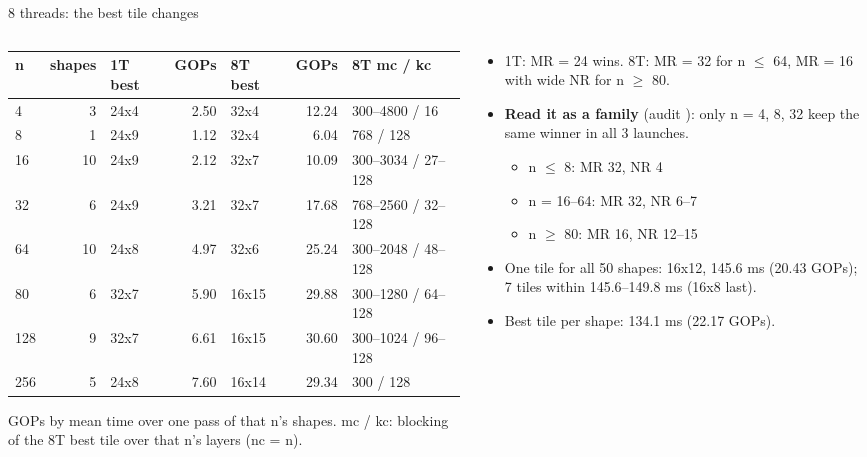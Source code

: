 \begin{frame}{8 threads: the best tile changes}
\begin{columns}[T]
\begin{column}{0.58\textwidth}
\tiny\setlength\tabcolsep{3pt}
\begin{tabular}{@{}lrlrlrl@{}}
\toprule
n & shapes & 1T best & GOPs & 8T best & GOPs & 8T mc / kc \\
\midrule
4 & 3 & 24x4 & 2.50 & 32x4 & 12.24 & 300--4800 / 16 \\
8 & 1 & 24x9 & 1.12 & 32x4 & 6.04 & 768 / 128 \\
16 & 10 & 24x9 & 2.12 & 32x7 & 10.09 & 300--3034 / 27--128 \\
32 & 6 & 24x9 & 3.21 & 32x7 & 17.68 & 768--2560 / 32--128 \\
64 & 10 & 24x8 & 4.97 & 32x6 & 25.24 & 300--2048 / 48--128 \\
80 & 6 & 32x7 & 5.90 & 16x15 & 29.88 & 300--1280 / 64--128 \\
128 & 9 & 32x7 & 6.61 & 16x15 & 30.60 & 300--1024 / 96--128 \\
256 & 5 & 24x8 & 7.60 & 16x14 & 29.34 & 300 / 128 \\
\bottomrule
\end{tabular}

\vspace{4pt}
GOPs by mean time over one pass of that n's shapes. mc / kc: blocking of the 8T best tile over that n's layers (nc = n).
\end{column}
\begin{column}{0.40\textwidth}
\small
\begin{itemize}\setlength\itemsep{3pt}
\item 1T: MR = 24 wins. 8T: MR = 32 for n $\le$ 64, MR = 16 with wide NR for n $\ge$ 80.
\item \textbf{Read it as a family} (audit ): only n = 4, 8, 32 keep the same winner in all 3 launches.
  \begin{itemize}
  \item n $\le$ 8: MR 32, NR 4
  \item n = 16--64: MR 32, NR 6--7
  \item n $\ge$ 80: MR 16, NR 12--15
  \end{itemize}
\item One tile for all 50 shapes: 16x12, 145.6 ms (20.43 GOPs); 7 tiles within 145.6--149.8 ms (16x8 last).
\item Best tile per shape: 134.1 ms (22.17 GOPs).
\end{itemize}
\end{column}
\end{columns}
\end{frame}

